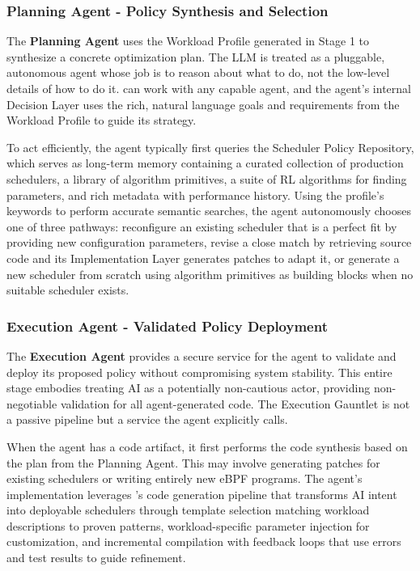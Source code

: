 \subsubsection{Planning Agent - Policy Synthesis and Selection}

The \textbf{Planning Agent} uses the Workload Profile generated in Stage 1 to synthesize a concrete optimization plan. The LLM is treated as a pluggable, autonomous agent whose job is to reason about what to do, not the low-level details of how to do it. \sys can work with any capable agent, and the agent's internal Decision Layer uses the rich, natural language goals and requirements from the Workload Profile to guide its strategy.

To act efficiently, the agent typically first queries the Scheduler Policy Repository, which serves as long-term memory containing a curated collection of production schedulers, a library of algorithm primitives, a suite of RL algorithms for finding parameters, and rich metadata with performance history. Using the profile's keywords to perform accurate semantic searches, the agent autonomously chooses one of three pathways: reconfigure an existing scheduler that is a perfect fit by providing new configuration parameters, revise a close match by retrieving source code and its Implementation Layer generates patches to adapt it, or generate a new scheduler from scratch using algorithm primitives as building blocks when no suitable scheduler exists.

\subsubsection{Execution Agent - Validated Policy Deployment}

The \textbf{Execution Agent} provides a secure service for the agent to validate and deploy its proposed policy without compromising system stability. This entire stage embodies treating AI as a potentially non-cautious actor, providing non-negotiable validation for all agent-generated code. The Execution Gauntlet is not a passive pipeline but a service the agent explicitly calls.

When the agent has a code artifact, it first performs the code synthesis based on the plan from the Planning Agent. This may involve generating patches for existing schedulers or writing entirely new eBPF programs. The agent's implementation leverages \sys's code generation pipeline that transforms AI intent into deployable schedulers through template selection matching workload descriptions to proven patterns, workload-specific parameter injection for customization, and incremental compilation with feedback loops that use errors and test results to guide refinement.

